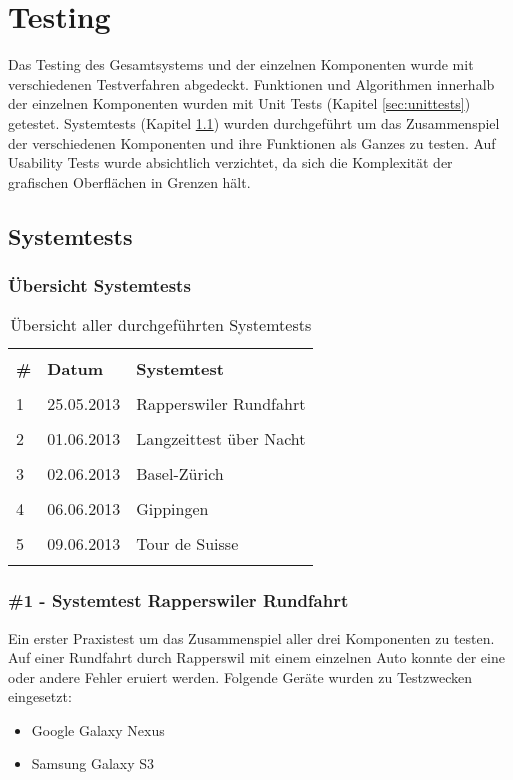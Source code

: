 \section{Testing}
Das Testing des Gesamtsystems und der einzelnen Komponenten wurde mit verschiedenen Testverfahren abgedeckt. Funktionen und Algorithmen innerhalb der einzelnen Komponenten wurden mit Unit Tests (Kapitel \ref{sec:unittests}) getestet. Systemtests (Kapitel \ref{sec:systemtests}) wurden durchgeführt um das Zusammenspiel der verschiedenen Komponenten und ihre Funktionen als Ganzes zu testen. Auf Usability Tests wurde absichtlich verzichtet, da sich die Komplexität der grafischen Oberflächen in Grenzen hält. 

\subsection{Systemtests}
\label{sec:systemtests}

\subsubsection{Übersicht Systemtests}
\begin{longtable}{p{0.3cm}|p{1.8cm}|p{9.3cm}}
& &  \\ [-1.5ex]
\textbf{\#} & \textbf{Datum} & \textbf{Systemtest} \\ [1ex] \hline & &  \\ [-1.5ex]
1 & 25.05.2013 & Rapperswiler Rundfahrt \\ [1ex] \hline & &  \\ [-1.5ex]
2 & 01.06.2013 & Langzeittest über Nacht \\ [1ex] \hline & &  \\ [-1.5ex]
3 & 02.06.2013 & Basel-Zürich \\ [1ex] \hline & &  \\ [-1.5ex]
4 & 06.06.2013 & Gippingen \\ [1ex] \hline & &  \\ [-1.5ex]
5 & 09.06.2013 & Tour de Suisse \\ [1ex]

\caption{Übersicht aller durchgeführten Systemtests}
\end{longtable} 

\subsubsection{\#1 - Systemtest Rapperswiler Rundfahrt}
Ein erster Praxistest um das Zusammenspiel aller drei Komponenten zu testen. Auf einer Rundfahrt durch Rapperswil mit einem einzelnen Auto konnte der eine oder andere Fehler eruiert werden. Folgende Geräte wurden zu Testzwecken eingesetzt:
\begin{itemize} [noitemsep,topsep=0pt]
	\item{Google Galaxy Nexus}
	\item{Samsung Galaxy S3}
\end{itemize}

